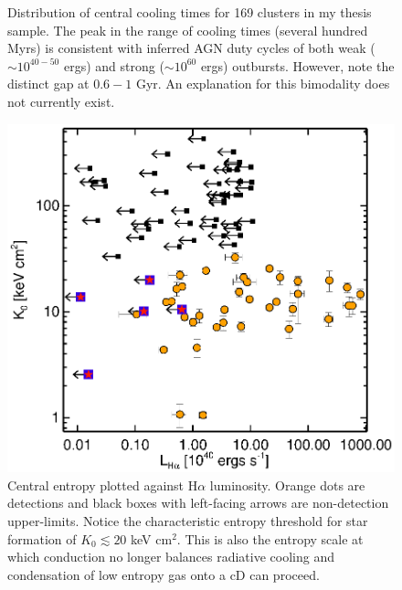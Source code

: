 \documentclass[11pt]{article}
\begin{document}
\begin{figure}[t]
\begin{minipage}[t]{0.5\linewidth}
        \caption{\small Distribution of central cooling times for 169
        clusters in my thesis sample. The peak in the range of cooling
        times (several hundred Myrs) is consistent with inferred AGN
        duty cycles of both weak ($\sim 10^{40-50}$ ergs) and strong ($\sim
        10^{60}$ ergs) outbursts. However, note the distinct gap at $0.6-1$
        Gyr. An explanation for this bimodality does not currently exist.}
        \label{fig:tcool}
    \end{minipage}
    \hspace{0.1cm}
    \begin{minipage}[t]{0.5\linewidth}
        \centering
        \includegraphics*[width=\textwidth, trim=28mm 8mm 30mm 10mm, clip]{ha_k0}
        \caption{\small Central entropy plotted against H$\alpha$
        luminosity. Orange dots are detections and black boxes with left-facing
        arrows are non-detection upper-limits. Notice the characteristic entropy threshold for star
        formation of $K_0 \lesssim 20$ keV cm$^2$. This is also the entropy scale at
        which conduction no longer balances radiative cooling and condensation
        of low entropy gas onto a cD can proceed.}
        \label{fig:ha}
    \end{minipage}
    \hspace{0.1in}
    \begin{minipage}[t]{0.5\linewidth}
        \centering

\end{minipage}
\end{figure}
\end{document}
